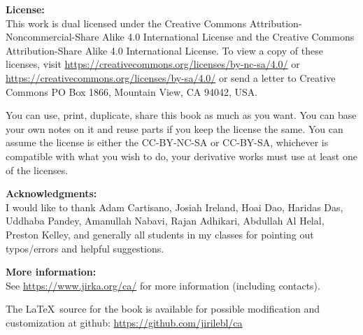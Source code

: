 \documentclass[12pt,openany]{book}
\theoremstyle{plain}
\theoremstyle{remark}
\theoremstyle{definition}
\theoremstyle{exercise}
\theoremstyle{example}
\begin{document}
\bigskip

\noindent
\textbf{License:}
\\
This work is dual licensed under
the Creative Commons
Attribution-Non\-commercial-Share Alike 4.0 International License and
the Creative Commons
Attribution-Share Alike 4.0 International License.
To view a
copy of these licenses, visit
\url{https://creativecommons.org/licenses/by-nc-sa/4.0/}
or
\url{https://creativecommons.org/licenses/by-sa/4.0/}
or send a letter to
Creative Commons
PO Box 1866, Mountain View, CA 94042, USA\@.

\bigskip

\noindent
You can use, print, duplicate, share this book as much as you want.  You can
base your own notes on it and reuse parts if you keep the license the
same.  You can assume the license is either the CC-BY-NC-SA or CC-BY-SA\@,
whichever is compatible with what you wish to do, your derivative works must
use at least one of the licenses.

\bigskip

\noindent
\textbf{Acknowledgments:}
\\
I would like to thank 
Adam Cartisano,
Josiah Ireland,
Hoai Dao,
Haridas Das,
Uddhaba Pandey,
Amanullah Nabavi,
Rajan Adhikari,
Abdullah Al Helal,
Preston Kelley,
and generally all students in my classes
for pointing out typos/errors
and helpful suggestions. 
%
%

\bigskip

\noindent
\textbf{More information:}
\\
See \url{https://www.jirka.org/ca/} for more information
(including contacts).

\medskip

\noindent
The \LaTeX\ source for the book is available
for possible modification and customization
at github: \url{https://github.com/jirilebl/ca}



\tableofcontents
{}

\end{document}
